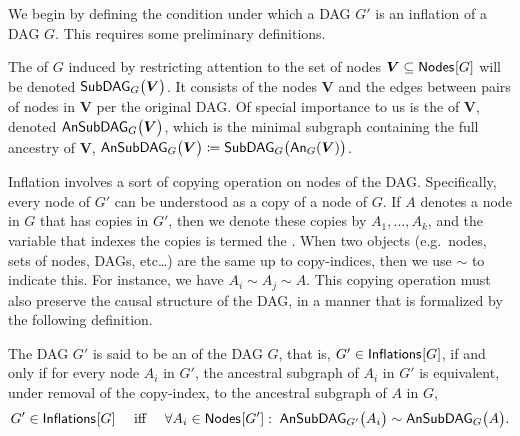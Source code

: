 We begin by defining the condition under which a DAG $G'$  is an inflation of a DAG $G$.  This requires some preliminary definitions. 

The  of $G$ induced by restricting attention to the set of nodes $\bm{V}\subseteq \SmallNamedFunction{Nodes}{G}$ will be denoted $\subgraph[G]{\bm{V}}$.
It consists of the nodes $\bm{V}$ and the edges between pairs of nodes in $\bm{V}$ per the original DAG. Of special importance to us is the 
 of $\bm{V}$, denoted $\ansubgraph[G]{\bm{V}}$, which is the minimal subgraph containing the full ancestry of $\bm{V}$, $\ansubgraph[G]{\bm{V}}\coloneqq\subgraph[G]{\An[G]{\bm{V}}}$. 

Inflation involves a sort of copying operation on nodes of the DAG.  Specifically, every node of $G'$ can be understood as a copy of a node of $G$.    If $A$ denotes a node in $G$ that has copies in $G'$, then we denote these copies by $A_1,\ldots, A_k$, and the variable that indexes the copies is termed the .  When two objects (e.g.~nodes, sets of nodes, DAGs, etc\ldots) are the same up to copy-indices, then we use $\sim$ to indicate this.  For instance, we have $A_i\sim A_j\sim A$.   This copying operation must also preserve the causal structure of the DAG, in a manner that is formalized by the following definition. 
\begin{definition}
The DAG $G'$ is said to be an  of the DAG $G$, that is, $G' \in \SmallNamedFunction{Inflations}{G}$, if and only if  for every node $A_i$ in $G'$, the ancestral subgraph of $A_i$ in $G'$ is equivalent, under removal of the copy-index, to the ancestral subgraph of $A$ in $G$,
\begin{align}\label{eq:definflationDAG}
G' \in\SmallNamedFunction{Inflations}{G} \quad\text{ iff }\quad \forall A_i\in \SmallNamedFunction{Nodes}{G'}:\; \ansubgraph[G']{A_i}\sim\ansubgraph[G]{A}.
\end{align}
\end{definition}

